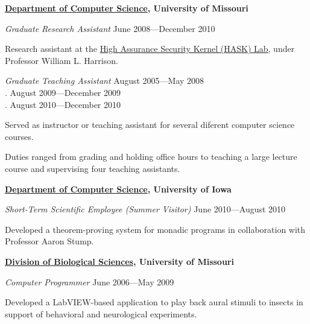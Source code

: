 \documentclass[10pt]{article}
\newenvironment{outerlist}[1][\enskip\textbullet]%
        {\begin{itemize}[#1]}{\end{itemize}%
         \vspace{-.6\baselineskip}}
\newenvironment{innerlist}[1][\enskip\textbullet]%
        {\begin{compactitem}[#1]}{\end{compactitem}}
\newcommand{\blankline}{\quad\pagebreak[2]}
\begin{document}
\textbf{\href{http://www.cs.missouri.edu/}{Department of Computer Science}, University of Missouri}
\begin{outerlist}
\item[] \textit{Graduate Research Assistant} \hfill June 2008---December 2010
        \begin{innerlist}
        \item Research assistant at the \href{http://hask.cs.missouri.edu/}{High Assurance Security Kernel (HASK) Lab}, under Professor William L. Harrison.
        \end{innerlist}

\item[] \textit{Graduate Teaching Assistant} \hfill August 2005---May 2008\\
        \color{white}.\color{black}          \hfill August 2009---December 2009\\
        \color{white}.\color{black}          \hfill August 2010---December 2010
        \begin{innerlist}
        \item Served as instructor or teaching assistant for several diferent computer science courses.
        \item Duties ranged from grading and holding office hours to teaching a large lecture course and supervising four teaching assistants.
        \end{innerlist}
\end{outerlist}

\blankline

\textbf{\href{http://www.cs.uiowa.edu/}{Department of Computer Science}, University of Iowa}
\begin{outerlist}
\item[] \textit{Short-Term Scientific Employee (Summer Visitor)} \hfill June 2010---August 2010
        \begin{innerlist}
        \item Developed a theorem-proving system for monadic programs in collaboration with Professor Aaron Stump.
        \end{innerlist}
\end{outerlist}

\blankline

\textbf{\href{http://www.biology.missouri.edu/}{Division of Biological Sciences}, University of Missouri}
\begin{outerlist}
\item[] \textit{Computer Programmer} \hfill June 2006---May 2009
        \begin{innerlist}
        \item Developed a LabVIEW-based application to play back aural stimuli to insects in support of behavioral and neurological experiments.
        \end{innerlist}
\end{outerlist}
\end{document}
